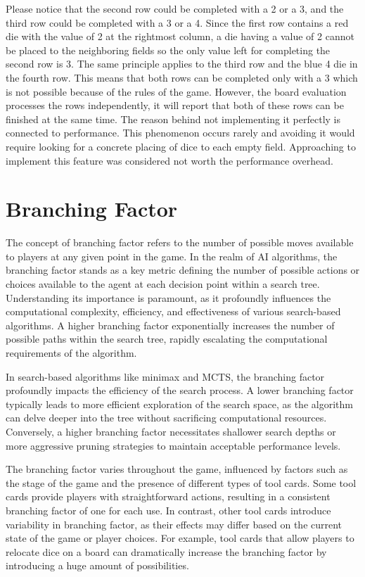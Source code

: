 Please notice that the second row could be completed with a 2 or a 3, and the third row could be completed with a 3 or a 4. Since the first row
contains a red die with the value of 2 at the rightmost column, a die having a value of 2 cannot be placed to the neighboring fields so the only 
value left for completing the second row is 3. The same principle applies to the third row and the blue 4 die in the fourth row. This means that 
both rows can be completed only with a 3 which is not possible because of the rules of the game. However, the board evaluation processes the rows
independently, it will report that both of these rows can be finished at the same time. The reason behind not implementing it perfectly is connected
to performance. This phenomenon occurs rarely and avoiding it would require looking for a concrete placing of dice to each empty field. Approaching
to implement this feature was considered not worth the performance overhead.


\section{Branching Factor}

The concept of branching factor refers to the number of possible moves available to players at any given point in the game.
In the realm of AI algorithms, the branching factor stands as a key metric defining the number of possible actions or choices available to the agent at 
each decision point within a search tree. Understanding its importance is paramount, as it profoundly influences the computational complexity, efficiency, 
and effectiveness of various search-based algorithms. A higher branching factor exponentially increases the number of possible paths within the search tree, 
rapidly escalating the computational requirements of the algorithm. 

In search-based algorithms like minimax and MCTS, the branching factor profoundly impacts the efficiency of the search process. A lower branching factor 
typically leads to more efficient exploration of the search space, as the algorithm can delve deeper into the tree without sacrificing computational resources. 
Conversely, a higher branching factor necessitates shallower search depths or more aggressive pruning strategies to maintain acceptable performance levels.

The branching factor varies throughout the game, influenced by factors such as the stage of the game and the presence of 
different types of tool cards. Some tool cards provide players with straightforward actions, resulting in a consistent 
branching factor of one for each use. In contrast, other tool cards introduce variability in branching factor, as their effects 
may differ based on the current state of the game or player choices. For example, tool cards that allow players to relocate dice 
on a board can dramatically increase the branching factor by introducing a huge amount of possibilities.

